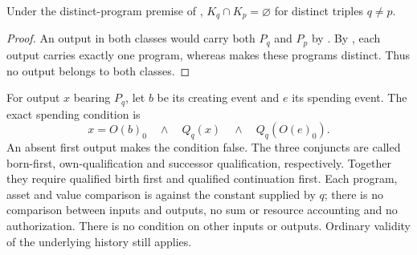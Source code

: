 \documentclass[../main.tex]{subfiles}
\begin{document}
\begin{proposition}
\label{prop:kpcfixed-model:disjoint-membership}
Under the distinct-program premise of ,
$K_q\cap K_p=\varnothing$ for distinct triples $q\ne p$.
\end{proposition}
\begin{proof}
An output in both classes would carry both $P_q$ and $P_p$ by
. By ,
each output carries exactly one program, whereas
 makes these programs
distinct. Thus no output belongs to both classes.
\end{proof}

\begin{definition}
\label{def:kpcfixed-model:first-output}
For output $x$ bearing $P_q$, let $b$ be its creating event and $e$ its
spending event. The exact spending condition is
\[
 x=O(b)_0\quad\land\quad Q_q(x)\quad\land\quad Q_q(O(e)_0).
\]
An absent first output makes the condition false. The three conjuncts are
called born-first, own-qualification and successor qualification, respectively.
Together they require qualified birth first and qualified continuation first. Each program,
asset and value comparison is against the constant supplied by $q$;
there is no comparison between inputs and outputs, no sum or resource
accounting and no authorization. There is no condition on other inputs
or outputs. Ordinary validity of the underlying history still applies.
\end{definition}
\end{document}
